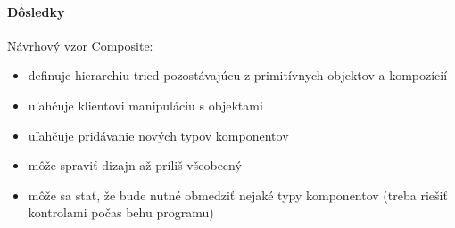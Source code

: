 		\paragraph{Dôsledky}
		Návrhový vzor Composite:
			\begin{itemize}
				\item definuje hierarchiu tried pozostávajúcu z primitívnych objektov a kompozícií
				\item uľahčuje klientovi manipuláciu s objektami
				\item uľahčuje pridávanie nových typov komponentov
				\item môže spraviť dizajn až príliš všeobecný
				\item môže sa stať, že bude nutné obmedziť nejaké typy komponentov (treba riešiť kontrolami počas behu programu)
			\end{itemize}
